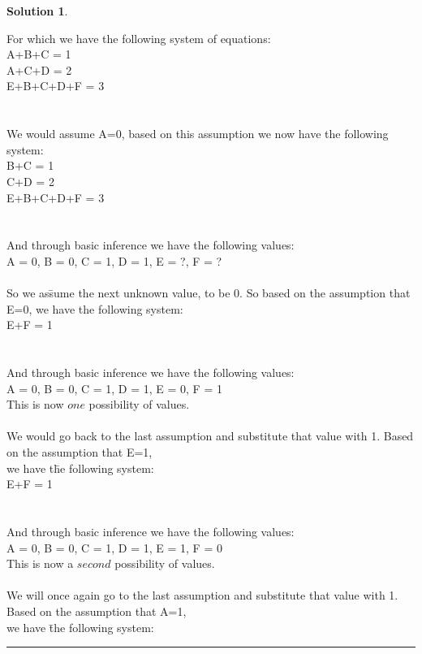 \documentclass{article}
\theoremstyle{definition}
\def\fline{\rule{0.75\linewidth}{0.5pt}}
\newcommand{\finishline}{\vspace{-15pt}\begin{center}\fline\end{center}}
\newtheorem*{solution*}{Solution}
\newenvironment{solution}{\begin{solution*}}{{\finishline} \end{solution*}}
\begin{document}
\begin{solution}
\begin{tabbing}
    For which we have the following system of equations: \\
	\>A+B+C = 1 \\
	\>A+C+D = 2 \\
	\>E+B+C+D+F = 3\=\\
     \\\\
	
    We would assume A=0, based on this assumption we now have the following system:\\
    \>B+C = 1 \\
	\>C+D = 2 \\
	\>E+B+C+D+F = 3\=\\
    \\\\
    And through basic inference we have the following values: \\
    {A = 0, B = 0, C = 1, D = 1, E = ?, F = ?}
    \\\\
    So we as\=sume the next unknown value, to be 0. So based on the assumption that E=0, we have the following system: \\
    
	\>E+F = 1\=\\
    \\\\
    And through basic inference we have the following values: \\
    {A = 0, B = 0, C = 1, D = 1, E = 0, F = 1}\\
    This is now $one$ possibility of values. 
    \\\\
    We would go back to the last assumption and substitute that value with 1. Based on the assumption that E=1,\\ we have t\=he following system: \\
    \>E+F = 1\=\\
    \\\\
    And through basic inference we have the following values: \\
    {A = 0, B = 0, C = 1, D = 1, E = 1, F = 0}\\
    This is now a $second$ possibility of values. 
    \\\\
    We will once again go to the last assumption and substitute that value with 1. Based on the assumption that A=1,\\ we have \=the following system:\\
    

\end{tabbing}
\end{solution}
\end{document}

